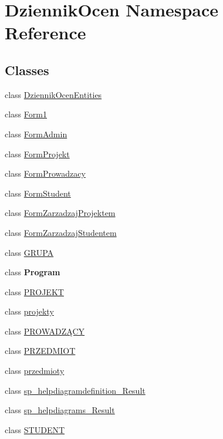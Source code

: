 \hypertarget{namespace_dziennik_ocen}{}\section{Dziennik\+Ocen Namespace Reference}
\label{namespace_dziennik_ocen}
\subsection*{Classes}
\begin{DoxyCompactItemize}
\item 
class \hyperlink{class_dziennik_ocen_1_1_dziennik_ocen_entities}{Dziennik\+Ocen\+Entities}
\item 
class \hyperlink{class_dziennik_ocen_1_1_form1}{Form1}
\item 
class \hyperlink{class_dziennik_ocen_1_1_form_admin}{Form\+Admin}
\item 
class \hyperlink{class_dziennik_ocen_1_1_form_projekt}{Form\+Projekt}
\item 
class \hyperlink{class_dziennik_ocen_1_1_form_prowadzacy}{Form\+Prowadzacy}
\item 
class \hyperlink{class_dziennik_ocen_1_1_form_student}{Form\+Student}
\item 
class \hyperlink{class_dziennik_ocen_1_1_form_zarzadzaj_projektem}{Form\+Zarzadzaj\+Projektem}
\item 
class \hyperlink{class_dziennik_ocen_1_1_form_zarzadzaj_studentem}{Form\+Zarzadzaj\+Studentem}
\item 
class \hyperlink{class_dziennik_ocen_1_1_g_r_u_p_a}{G\+R\+U\+PA}
\item 
class {\bfseries Program}
\item 
class \hyperlink{class_dziennik_ocen_1_1_p_r_o_j_e_k_t}{P\+R\+O\+J\+E\+KT}
\item 
class \hyperlink{class_dziennik_ocen_1_1projekty}{projekty}
\item 
class \hyperlink{class_dziennik_ocen_1_1_p_r_o_w_a_d_z_xC4_x84_c_y}{P\+R\+O\+W\+A\+D\+ZĄ\+CY}
\item 
class \hyperlink{class_dziennik_ocen_1_1_p_r_z_e_d_m_i_o_t}{P\+R\+Z\+E\+D\+M\+I\+OT}
\item 
class \hyperlink{class_dziennik_ocen_1_1przedmioty}{przedmioty}
\item 
class \hyperlink{class_dziennik_ocen_1_1sp__helpdiagramdefinition___result}{sp\+\_\+helpdiagramdefinition\+\_\+\+Result}
\item 
class \hyperlink{class_dziennik_ocen_1_1sp__helpdiagrams___result}{sp\+\_\+helpdiagrams\+\_\+\+Result}
\item 
class \hyperlink{class_dziennik_ocen_1_1_s_t_u_d_e_n_t}{S\+T\+U\+D\+E\+NT}
\end{DoxyCompactItemize}
